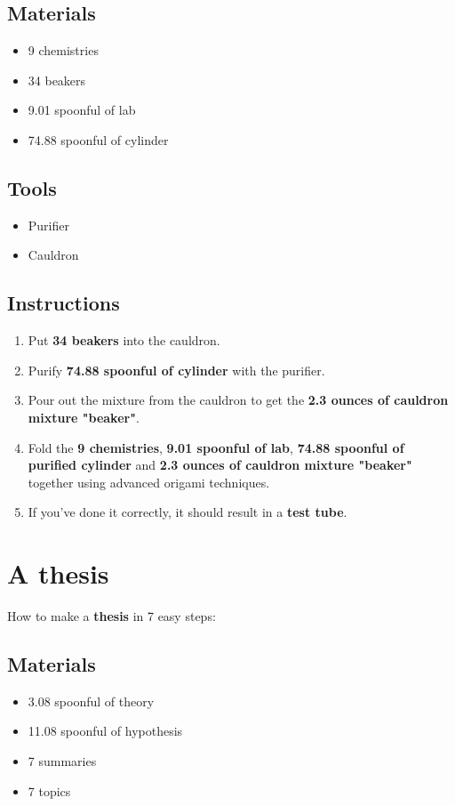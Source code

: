 \documentclass{article}
\begin{document}
\subsection{Materials}\begin{itemize}
\item 
9 chemistries
\item 
34 beakers
\item 
9.01 spoonful of lab
\item 
74.88 spoonful of cylinder
\end{itemize}
\subsection{Tools}\begin{itemize}
\item 
Purifier
\item 
Cauldron
\end{itemize}
\subsection{Instructions}\begin{enumerate}
\item 
Put \textbf{34 beakers} into the cauldron.
\item 
Purify \textbf{74.88 spoonful of cylinder} with the purifier.
\item 
Pour out the mixture from the cauldron to get the \textbf{2.3 ounces of cauldron mixture "beaker"}.
\item 
Fold the \textbf{9 chemistries}, \textbf{9.01 spoonful of lab}, \textbf{74.88 spoonful of purified cylinder} and \textbf{2.3 ounces of cauldron mixture "beaker"} together using advanced origami techniques.
\item 
If you've done it correctly, it should result in a \textbf{test tube}.
\end{enumerate}
\newpage
\section{A thesis}How to make a \textbf{thesis} in 7 easy steps:

\subsection{Materials}\begin{itemize}
\item 
3.08 spoonful of theory
\item 
11.08 spoonful of hypothesis
\item 
7 summaries
\item 
7 topics
\end{itemize}
\end{document}
